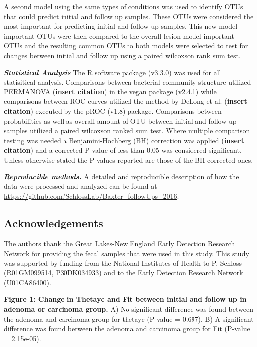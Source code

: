 \documentclass[12pt,]{article}
\begin{document}
A second model using the same types of conditions was used to identify
OTUs that could predict initial and follow up samples. These OTUs were
considered the most important for predicting initial and follow up
samples. This new model important OTUs were then compared to the overall
lesion model important OTUs and the resulting common OTUs to both models
were selected to test for changes between initial and follow up using a
paired wilcoxson rank sum test.

\textbf{\emph{Statistical Analysis}} The R software package (v3.3.0) was
used for all statisitical analysis. Comparisons between bacterial
community structure utilized PERMANOVA (\textbf{insert citation}) in the
vegan package (v2.4.1) while comparisons between ROC curves utilized the
method by DeLong et al. (\textbf{insert citation}) executed by the pROC
(v1.8) package. Comparisons between probabilities as well as overall
amount of OTU between initial and follow up samples utilized a paired
wilcoxson ranked sum test. Where multiple comparison testing was needed
a Benjamini-Hochberg (BH) correction was applied (\textbf{insert
citation}) and a corrected P-value of less than 0.05 was considered
significant. Unless otherwise stated the P-values reported are those of
the BH corrected ones.

\textbf{\emph{Reproducible methods.}} A detailed and reproducible
description of how the data were processed and analyzed can be found at
\url{https://github.com/SchlossLab/Baxter_followUps_2016}.

\newpage

\subsection{Acknowledgements}\label{acknowledgements}

The authors thank the Great Lakes-New England Early Detection Research
Network for providing the fecal samples that were used in this study.
This study was supported by funding from the National Institutes of
Health to P. Schloss (R01GM099514, P30DK034933) and to the Early
Detection Research Network (U01CA86400).

\newpage

\textbf{Figure 1: Change in Thetayc and Fit between initial and follow
up in adenoma or carcinoma group.} A) No significant difference was
found between the adenoma and carcinoma group for thetayc (P-value =
0.697). B) A significant difference was found between the adenoma and
carcinoma group for Fit (P-value = 2.15e-05).
\end{document}
